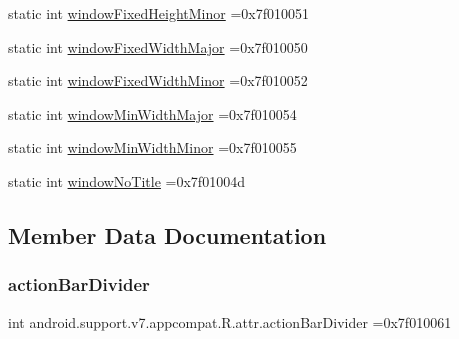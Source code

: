 \begin{DoxyCompactItemize}
\item 
static int \hyperlink{classandroid_1_1support_1_1v7_1_1appcompat_1_1R_1_1attr_a878de167a65f79db62c6640c6e39022d}{window\+Fixed\+Height\+Minor} =0x7f010051
\item 
static int \hyperlink{classandroid_1_1support_1_1v7_1_1appcompat_1_1R_1_1attr_ae79b85d9c96e6c1271593d8f7bb17458}{window\+Fixed\+Width\+Major} =0x7f010050
\item 
static int \hyperlink{classandroid_1_1support_1_1v7_1_1appcompat_1_1R_1_1attr_a4959f1dee20f8e0c30bc87c8400018d8}{window\+Fixed\+Width\+Minor} =0x7f010052
\item 
static int \hyperlink{classandroid_1_1support_1_1v7_1_1appcompat_1_1R_1_1attr_aeb051e893d3a1293b81a53d5f8eecc36}{window\+Min\+Width\+Major} =0x7f010054
\item 
static int \hyperlink{classandroid_1_1support_1_1v7_1_1appcompat_1_1R_1_1attr_a44efbb3ecb10ad7ef826badb3c6342ac}{window\+Min\+Width\+Minor} =0x7f010055
\item 
static int \hyperlink{classandroid_1_1support_1_1v7_1_1appcompat_1_1R_1_1attr_a9f5fa98788f7d689538690d3e654a5a8}{window\+No\+Title} =0x7f01004d
\end{DoxyCompactItemize}


\subsection{Member Data Documentation}
\mbox{\label{classandroid_1_1support_1_1v7_1_1appcompat_1_1R_1_1attr_acffa48b16d0a323e2269b6253d3706b6}} 
\subsubsection{\texorpdfstring{action\+Bar\+Divider}{actionBarDivider}}
{\footnotesize\ttfamily int android.\+support.\+v7.\+appcompat.\+R.\+attr.\+action\+Bar\+Divider =0x7f010061\hspace{0.3cm}{\ttfamily [static]}}

